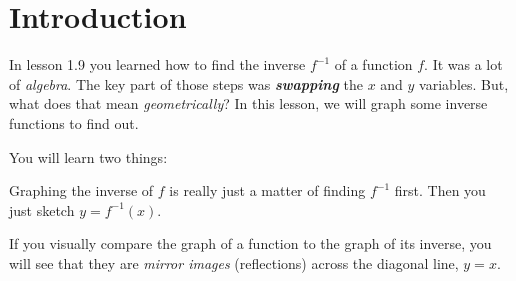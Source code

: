 \section*{Introduction}

In lesson 1.9 you learned how to find the inverse $f^{-1}$ 
of a function $f$.
It was a lot of \emph{algebra}.
The key part of those steps was {\bfseries\itshape swapping} 
the $x$ and $y$ variables. 
But, what does that mean \emph{geometrically}? 
In this lesson, we will graph some inverse functions to find out.

You will learn two things:

\begin{center}
\begin{tcolorbox}[width=4in]
    Graphing the inverse of $f$ is really just a matter 
    of finding $f^{-1}$ first. 
    Then you just sketch $y = f^{-1}(x)$.
\end{tcolorbox}
\end{center}

\begin{center}
\begin{tcolorbox}[width=4in]
    If you visually compare the graph of a function
    to the graph of its inverse,
    you will see that they are \emph{mirror images} (reflections)
    across the diagonal line, $y=x$.
\end{tcolorbox}
\end{center}
